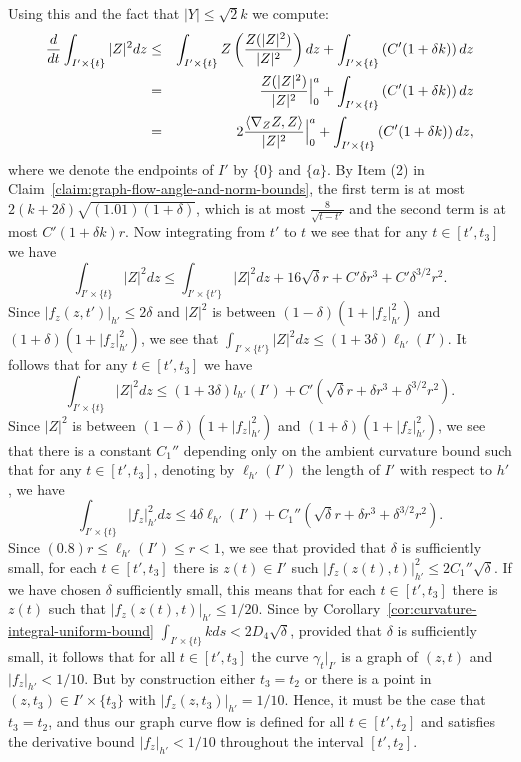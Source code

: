 Using this and the fact that $|Y|\le \sqrt{2}k$ we compute:
\begin{eqnarray*}
\frac{d}{dt}\int_{I'\times\{t\}}|Z|^2dz & \le & \int_{I'\times\{t\}}
Z\left(\frac{Z(|Z|^2)}{|Z|^2}\right)dz +\int_{I'\times \{t\}}\left(C'(1+\delta
k)\right) dz
 \\
& = & \frac{Z(|Z|^2)}{|Z|^2}\Bigl|_0^a\Bigr.+\int_{I'\times\{t\}}\left(C'(1+\delta k)\right) dz \\
& = & 2\frac{\langle \nabla_ZZ,Z\rangle}{|Z|^2}\Bigl|_0^a\Bigr.
+\int_{I'\times\{t\}}\left(C'(1+\delta k)\right) dz,
\end{eqnarray*}
where we denote the endpoints of $I'$ by $\{0\}$ and $\{a\}$. By Item (2) in
Claim~\ref{claim:graph-flow-angle-and-norm-bounds}, the first term is at most
$2(k+2\delta)\sqrt{(1.01)(1+\delta)}$, which is at most $\frac{8}{\sqrt{t-t'}}$
and the second term is at most $C'(1+\delta k) r$. Now integrating from $t'$ to
$t$ we see that for any $t\in [t',t_3]$ we have
$$\int_{I'\times\{t\}}|Z|^2dz\le\int_{I'\times\{t'\}}|Z|^2dz+16\sqrt{\delta}r+C'\delta
r^3+C'\delta^{3/2}r^2.$$  Since $|f_z(z,t')|_{h'}\le 2\delta$ and $|Z|^2$ is
between $(1-\delta)(1+|f_z|_{h'}^2)$ and $(1+\delta)(1+|f_z|_{h'}^2)$,  we see
that $\int_{I'\times\{t'\}}|Z|^2dz\le (1+3\delta)\ell_{h'}(I')$. It follows
that for any $t\in [t',t_3]$ we have
$$\int_{I'\times\{t\}}|Z|^2dz\le (1+3\delta)l_{h'}(I')+C'(\sqrt{\delta}r+\delta r^3+\delta^{3/2}r^2).$$
Since $|Z|^2$ is between $(1-\delta)(1+|f_z|_{h'}^2)$ and
$(1+\delta)(1+|f_z|_{h'}^2)$, we see that there is a constant
$C_1''$ depending only on the ambient curvature bound such that for
any $t\in [t',t_3]$, denoting by $\ell_{h'}(I')$ the length of $I'$
with respect to $h'$, we have
$$\int_{I'\times\{t\}}|f_z|_{h'}^2dz\le 4\delta\ell_{h'}(I')
+C_1''(\sqrt{\delta}r+\delta r^3+\delta^{3/2}r^2).$$ Since
$(0.8)r\le \ell_{h'}(I')\le r<1$, we see  that provided that
$\delta$ is sufficiently small, for each $t\in [t',t_3]$ there is
$z(t)\in I'$ such $|f_z(z(t),t)|^2_{h'}\le 2C_1''\sqrt{\delta}$. If
we have chosen $\delta$ sufficiently small, this means that for each
$t\in [t',t_3]$ there is $z(t)$ such that $|f_z(z(t),t)|_{h'}\le
1/20$. Since by Corollary~\ref{cor:curvature-integral-uniform-bound}
$\int_{I'\times\{t\}}kds<2D_4\sqrt{\delta}$,
 provided that $\delta$ is sufficiently small, it follows that for all
 $t\in[t',t_3]$ the
curve $\gamma_t|_{I'}$ is a graph of $(z,t)$ and $|f_z|_{h'}<1/10$. But by
construction either $t_3=t_2$ or there is a point in $(z,t_3)\in I'\times
\{t_3\}$ with $|f_z(z,t_3)|_{h'}=1/10$. Hence, it must be the case that
$t_3=t_2$, and thus our graph curve flow is defined for all $t\in [t',t_2]$ and
satisfies the derivative bound $|f_z|_{h'}< 1/10$ throughout the interval
$[t',t_2]$.

